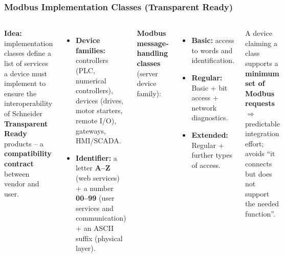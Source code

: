 \begin{frame}
	\frametitle{Modbus Implementation Classes (Transparent Ready)}
	\begin{columns}[T,onlytextwidth]
		\footnotesize
		\textbf{Idea:} implementation classes define a \alert{list of services} a device must implement to ensure the interoperability of Schneider \textbf{Transparent Ready} products -- a \textbf{compatibility contract} between vendor and user.
		\begin{itemize}
			\item \textbf{Device families:} controllers (PLC, numerical controllers), devices (drives, motor starters, remote I/O), gateways, HMI/SCADA.
			\item \textbf{Identifier:} a letter \textbf{A--Z} (web services) + a number \textbf{00--99} (user services and communication) + an ASCII suffix (physical layer).
		\end{itemize}
		\footnotesize
		\textbf{Modbus message-handling classes} (server device family):
		\begin{itemize}
			\item \textbf{Basic:} access to words and identification.
			\item \textbf{Regular:} Basic + bit access + network diagnostics.
			\item \textbf{Extended:} Regular + further types of access.
		\end{itemize}
		A device claiming a class supports a \textbf{minimum set of Modbus requests} $\Rightarrow$ predictable integration effort; avoids ``it connects but does not support the needed function''.
	\end{columns}
\end{frame}

